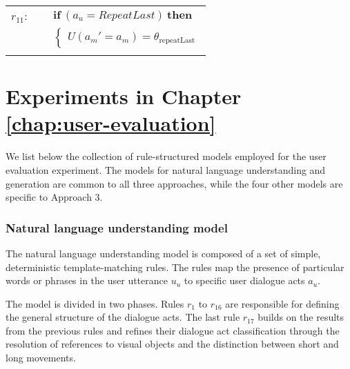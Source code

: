 \begin{footnotesize}
\begin{longtable}{p{1cm}p{14cm}}
$r_{11}$: \ \ & $ \textbf{if} \ (\mathit{a_u}\!=\!\mathit{RepeatLast}) \ \textbf{then} $ \\
 & \;\;\;\;\; $ \begin{cases}U(\mathit{a_m}'\!=\!\mathit{{a_m}})\!=\!\theta_{\mathrm{repeatLast}} \end{cases}$ \\ \\[-1mm]
\end{longtable}
\end{footnotesize}

\section{Experiments in Chapter \ref{chap:user-evaluation}}
\label{sec:domainspecs-usereval}

We list below the collection of rule-structured models employed for the user evaluation experiment.  The models for natural language understanding and generation are common to all three approaches, while the four other models are specific to Approach 3.

\subsubsection*{Natural language understanding model}

The natural language understanding model is composed of a set of simple, deterministic template-matching rules.  The rules map the presence of particular words or phrases in the user utterance $u_u$ to specific user dialogue acts $a_u$. 

The model is divided in two phases.  Rules $r_1$ to $r_{16}$ are responsible for defining the general structure of the dialogue acts.  The last rule $r_{17}$ builds on the results from the previous rules and refines their dialogue act classification through the resolution of references to visual objects and the distinction between short and long movements. 

